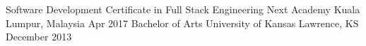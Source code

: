\documentclass[]{awesome-cv}
\begin{document}
\begin{cventries}
	\cventry
	{Software Development Certificate in Full Stack Engineering}
	{Next Academy}
	{Kuala Lumpur, Malaysia}
	{Apr 2017}
	{}
	\cventry
	{Bachelor of Arts}
	{University of Kansas}
	{Lawrence, KS}
	{December 2013}
	{}
\end{cventries}

\vspace{-2mm}
\end{document}
